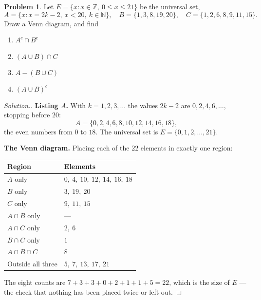 \documentclass[11pt,a4paper]{article}
\theoremstyle{definition}
\newtheorem{problemx}{Problem}[section]
\newenvironment{problem}{\begin{problemx}}{\end{problemx}}
\newenvironment{solution}
  {\renewcommand{\qedsymbol}{}\begin{proof}[\textit{Solution}.]}
  {\end{proof}}
\begin{document}
\begin{problem}
Let $E=\{x: x\in\mathbb{Z},\ 0\leq x\leq 21\}$ be the universal set,
$$A=\{x: x=2k-2,\ x<20,\ k\in\mathbb{N}\},\quad B=\{1,3,8,19,20\},\quad
C=\{1,2,6,8,9,11,15\}.$$
Draw a Venn diagram, and find
\begin{enumerate}
\item[(i).] $A^c\cap B^c$
\item[(ii).] $(A\cup B)\cap C$
\item[(iii).] $A-(B\cup C)$
\item[(iv).] $(A\cup B)^c$
\end{enumerate}
\end{problem}

\begin{solution}
\textbf{Listing $A$.} With $k=1,2,3,\ldots$ the values $2k-2$ are
$0,2,4,6,\ldots$, stopping before $20$:
$$A=\{0,2,4,6,8,10,12,14,16,18\},$$
the even numbers from $0$ to $18$. The universal set is
$E=\{0,1,2,\ldots,21\}$.

\textbf{The Venn diagram.} Placing each of the $22$ elements in exactly one region:

\begin{table}[H]
\centering
\begin{tabular}{|l|l|}
\hline
Region & Elements\\
\hline
$A$ only & $0,\ 4,\ 10,\ 12,\ 14,\ 16,\ 18$\\
$B$ only & $3,\ 19,\ 20$\\
$C$ only & $9,\ 11,\ 15$\\
$A\cap B$ only & --- \\
$A\cap C$ only & $2,\ 6$\\
$B\cap C$ only & $1$\\
$A\cap B\cap C$ & $8$\\
Outside all three & $5,\ 7,\ 13,\ 17,\ 21$\\
\hline
\end{tabular}
\end{table}

The eight counts are $7+3+3+0+2+1+1+5=22$, which is the size of $E$ --- the check that
nothing has been placed twice or left out.


\end{solution}
\end{document}
